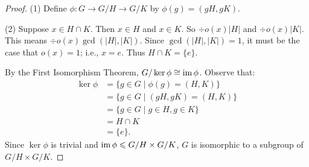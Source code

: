\documentclass[11pt,twoside,openany]{memoir}
\begin{document}
        {\color{blue} \begin{proof}
            (1) Define $\phi:G \rightarrow G/H \rightarrow G/K$ by $\phi(g) = (gH,gK)$. \nl
            
            \noindent (2) Suppose $x \in H \cap K$. Then $x \in H$ and $x \in K$. So $\div{o(x)}{|H|}$ and $\div{o(x)}{|K|}$. This means $\div{o(x)}{\gcd(|H|,|K|)}$. Since $\gcd(|H|,|K|) = 1$, it must be the case that $o(x) = 1$; i.e., $x = e$. Thus $H \cap K = \{e\}$.
            
            By the First Isomorphism Theorem, $G/\ker\phi \cong \operatorname{im} \phi$. Observe that:
                \begin{equation*}
                \begin{split}
                    \ker \phi  
                    & = \{g \in G \mid \phi(g) = (H,K)\} \\
                    & = \{g \in G \mid (gH,gK) = (H,K)\} \\
                    & = \{g \in G \mid g \in H, g \in K\} \\
                    & = H \cap K \\
                    & = \{e\}.
                \end{split}
                \end{equation*}
            Since $\ker \phi$ is trivial and $\operatorname{im} \phi \leqslant G/H \times G/K$, $G$ is isomorphic to a subgroup of $G/H \times G/K$. \nl
            

\end{proof}}
\end{document}
